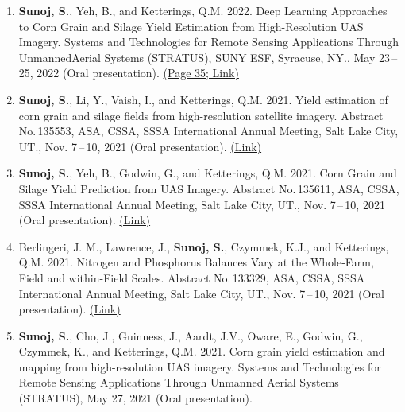\documentclass[11pt]{article}
\begin{document}
\begin{enumerate}[itemsep=-2pt]


\item \textbf{Sunoj, S.}, Yeh, B., and Ketterings, Q.M. 2022. Deep Learning Approaches to Corn Grain and Silage Yield Estimation from High-Resolution UAS Imagery. Systems and Technologies for Remote Sensing Applications Through UnmannedAerial Systems (STRATUS), SUNY ESF, Syracuse, NY., May 23\,–\,25, 2022 (Oral presentation). \href{https://www.esf.edu/stratus/stratus-2022-5-23.pdf#page=35}{(Page 35; Link)}

\item \textbf{Sunoj, S.}, Li, Y., Vaish, I., and Ketterings, Q.M. 2021. Yield estimation of corn grain and silage fields from high-resolution satellite imagery. Abstract No.\,135553, ASA, CSSA, SSSA International Annual Meeting, Salt Lake City, UT., Nov. 7\,–\,10, 2021 (Oral presentation). \href{https://scisoc.confex.com/scisoc/2021am/meetingapp.cgi/Paper/135553}{(Link)}

\item \textbf{Sunoj, S.}, Yeh, B., Godwin, G., and Ketterings, Q.M. 2021. Corn Grain and Silage Yield Prediction from UAS Imagery. Abstract No.\,135611, ASA, CSSA, SSSA International Annual Meeting, Salt Lake City, UT., Nov.  7\,–\,10, 2021 (Oral presentation). \href{https://scisoc.confex.com/scisoc/2021am/meetingapp.cgi/Paper/135611}{(Link)}

\item Berlingeri, J. M., Lawrence, J., \textbf{Sunoj, S.}, Czymmek, K.J., and Ketterings, Q.M. 2021. Nitrogen and Phosphorus Balances Vary at the Whole-Farm, Field and within-Field Scales. Abstract No.\,133329, ASA, CSSA, SSSA International Annual Meeting, Salt Lake City, UT., Nov.  7\,–\,10, 2021 (Oral presentation). \href{https://scisoc.confex.com/scisoc/2021am/meetingapp.cgi/Paper/133329}{(Link)}

\item \textbf{Sunoj, S.}, Cho, J., Guinness, J., Aardt, J.V., Oware, E., Godwin, G., Czymmek, K., and Ketterings, Q.M. 2021. Corn grain yield estimation and mapping from high-resolution UAS imagery. Systems and Technologies for Remote Sensing Applications Through Unmanned Aerial Systems (STRATUS), May 27, 2021 (Oral presentation).


\end{enumerate}
\end{document}
